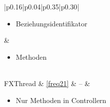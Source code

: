 \begin{longtable}[H]{|p{0.16\textwidth}|p{0.04\textwidth}|p{0.35\textwidth}|p{0.30\textwidth}|}
\begin{minipage}[t]{\linewidth}
			\begin{itemize}[nosep,after=\strut,leftmargin=*]
				\item Beziehungsidentifikator
			\end{itemize}
		\end{minipage} & 
		\begin{minipage}[t]{\linewidth}
			\begin{itemize}[nosep,after=\strut,leftmargin=*]
				\item Methoden
			\end{itemize}
		\end{minipage} \\
		\hline
		FXThread & \ref{freq21} & -- & 
		\begin{minipage}[t]{\linewidth}
			\begin{itemize}[nosep,after=\strut,leftmargin=*]
				\item Nur Methoden in Controllern
			\end{itemize}
		\end{minipage} \\
		\hline
\end{longtable}